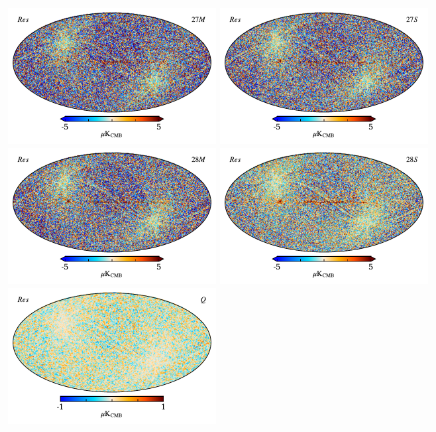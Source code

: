 \documentclass{aa}
\begin{document}
\begin{figure}
  \centering
  \includegraphics[width=0.49\textwidth]{figs/sim_diff_T_27M.pdf}
  \includegraphics[width=0.49\textwidth]{figs/sim_diff_T_27S.pdf}\\
  \includegraphics[width=0.49\textwidth]{figs/sim_diff_T_28M.pdf}
  \includegraphics[width=0.49\textwidth]{figs/sim_diff_T_28S.pdf}\\
  \includegraphics[width=0.49\textwidth]{figs/sim_diff_Q.pdf}

\end{figure}
\end{document}
